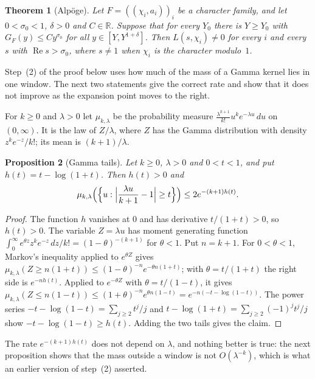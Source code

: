 \documentclass[11pt]{amsbook}
\theoremstyle{plain}
\newtheorem{theorem}{Theorem}[section]
\newtheorem{proposition}[theorem]{Proposition}
\theoremstyle{definition}
\theoremstyle{remark}
\numberwithin{equation}{section}
\numberwithin{figure}{chapter}
\numberwithin{table}{chapter}
\newcommand{\R}{\mathbb{R}}
\begin{document}
\begin{theorem}[Alp\"oge]\label{thm:windowed-landau}
Let $F=((\chi_i,a_i))_i$ be a character family, and let
$0<\sigma_0<1$, $\delta>0$ and $C\in\R$. Suppose that for every $Y_0$
there is $Y\ge Y_0$ with $G_F(y)\le Cy^{\sigma_0}$ for all
$y\in[Y,Y^{1+\delta}]$. Then $L(s,\chi_i)\ne0$ for every $i$ and every
$s$ with $\operatorname{Re}s>\sigma_0$, where $s\ne1$ when $\chi_i$ is
the character modulo~$1$.
\end{theorem}

Step~(2) of the proof below uses how much of the mass of a Gamma
kernel lies in one window. The next two statements give the correct
rate and show that it does not improve as the expansion point moves
to the right.

For $k\ge0$ and $\lambda>0$ let $\mu_{k,\lambda}$ be the probability
measure $\frac{\lambda^{k+1}}{k!}u^ke^{-\lambda u}\,du$ on $(0,\infty)$.
It is the law of $Z/\lambda$, where $Z$ has the Gamma distribution
with density $z^ke^{-z}/k!$; its mean is $(k+1)/\lambda$.

\begin{proposition}[Gamma tails]\label{prop:gamma-tails}
Let $k\ge0$, $\lambda>0$ and $0<t<1$, and put $h(t)=t-\log(1+t)$.
Then $h(t)>0$ and
\[
\mu_{k,\lambda}\Bigl(\Bigl\{u:\Bigl|\frac{\lambda u}{k+1}-1\Bigr|
\ge t\Bigr\}\Bigr)\le2e^{-(k+1)h(t)}.
\]
\end{proposition}

\begin{proof}
The function $h$ vanishes at $0$ and has derivative $t/(1+t)>0$, so
$h(t)>0$. The variable $Z=\lambda u$ has moment generating function
$\int_0^\infty e^{\theta z}z^ke^{-z}\,dz/k!=(1-\theta)^{-(k+1)}$ for
$\theta<1$. Put $n=k+1$. For $0<\theta<1$, Markov's inequality applied
to $e^{\theta Z}$ gives
$\mu_{k,\lambda}(Z\ge n(1+t))\le(1-\theta)^{-n}e^{-\theta n(1+t)}$;
with $\theta=t/(1+t)$ the right side is $e^{-nh(t)}$. Applied to
$e^{-\theta Z}$ with $\theta=t/(1-t)$, it gives
$\mu_{k,\lambda}(Z\le n(1-t))\le(1+\theta)^{-n}e^{\theta n(1-t)}
=e^{-n(-t-\log(1-t))}$. The power series
$-t-\log(1-t)=\sum_{j\ge2}t^j/j$ and $t-\log(1+t)=\sum_{j\ge2}
(-1)^jt^j/j$ show $-t-\log(1-t)\ge h(t)$. Adding the two tails gives
the claim.
\end{proof}

The rate $e^{-(k+1)h(t)}$ does not depend on $\lambda$, and nothing
better is true: the next proposition shows that the mass outside a
window is not $O(\lambda^{-k})$, which is what an earlier version of
step~(2) asserted.
\end{document}
